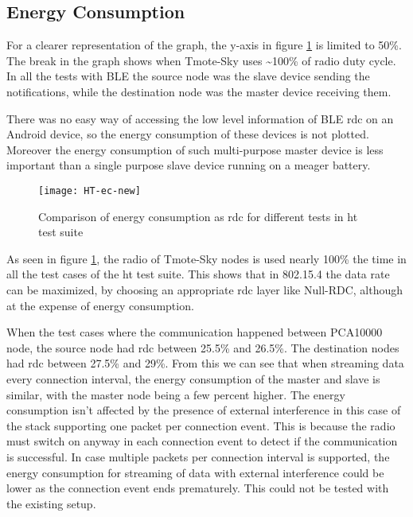 
\subsection{Energy Consumption}
For a clearer representation of the graph, the y-axis in figure \ref{fig:HT-ec} is limited to 50\%. The break in the graph shows when Tmote-Sky uses \textasciitilde100\% of radio duty cycle. In all the tests with BLE the source node was the slave device sending the notifications, while the destination node was the master device receiving them.

There was no easy way of accessing the low level information of BLE \gls{rdc} on an Android device, so the energy consumption of these devices is not plotted. Moreover the energy consumption of such multi-purpose master device is less important than a single purpose slave device running on a meager battery.

\begin{figure}[tb]
\texttt{[image: HT-ec-new]}
\caption{Comparison of energy consumption as \gls{rdc} for different tests in \gls{ht} test suite}
\label{fig:HT-ec}
\end{figure}

As seen in figure \ref{fig:HT-ec}, the radio of Tmote-Sky nodes is used nearly 100\% the time in all the test cases of the \gls{ht} test suite. This shows that in 802.15.4 the data rate can be maximized, by choosing an appropriate \gls{rdc} layer like Null-RDC, although at the expense of energy consumption. 

When the test cases where the communication happened between PCA10000 node, the source node had \gls{rdc} between 25.5\% and 26.5\%. The destination nodes had \gls{rdc} between 27.5\% and 29\%. From this we can see that when streaming data every connection interval, the energy consumption of the master and slave is similar, with the master node being a few percent higher. The energy consumption isn't affected by the presence of external interference in this case of the stack supporting one packet per connection event. This is because the radio must switch on anyway in each connection event to detect if the communication is successful. In case multiple packets per connection interval is supported, the energy consumption for streaming of data with external interference could be lower as the connection event ends prematurely. This could not be tested with the existing setup.

